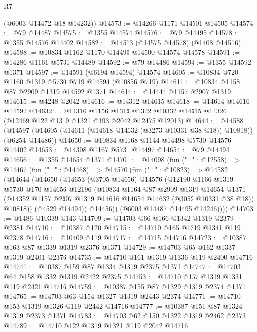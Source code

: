 \begin{lexlean}{R7}
\begin{coremodule}
      (@6003 @14472 @18 @14232))
@14573 := @14266 @1171 @14501 @14505
@14574 := @79 @14487
@14575 := @1355 @14574
@14576 := @79 @14495
@14578 := @1355 @14576 @14402
@14582 := @14573 (@14575 @14578) (@1408 @14516)
@14588 := @10834 @1162 @1170 @14490 @14500 @14574 @14578
@14591 := @14286 @1161 @5731 @14489
@14592 := @79 @14486
@14594 := @1355 @14592 @1371
@14597 := @14591 (@6194 @14594) @14574
@14605 := @10834 @720 @1160 @1319 @5730 @719 @14594 (@10856 @719)
@14611 := @10834 @1158 @87 @2909 @1319 @14592 @1371
@14614 := @14444 @1157 @2907 @1319
@14615 := @4248 @2042
@14616 := @14312 @14615
@14618 := @14614 @14616 @14592
@14632 := @14316
    @1156
    @1319
    @1322
    @10332
    @14615
    @14326
    (@12469 @122 @1319 @1321 @193 @2042 @12475 @12013)
@14644 := @14588
    (@14597 (@14605 (@14611 (@14618 @14632 (@3273 @10331 @38 @18)) @10818)) (@6254 @14486))
@14650 := @10834 @1168 @1144 @14498 @5730 @14576 @14402
@14653 := @14308 @1167 @5731 @14497
@14654 := @79 @14494
@14656 := @1355 @14654 @1371
@14701 := @14098
    (fun ("_" : @12558) =>
    @14467
      (fun ("_" : @14468) =>
      @14570
        (fun ("_" : @10823) =>
        @14582
          (@14644
            (@14650
              (@14653
                (@3705 @14656)
                @14576
                (@12190
                  @1166
                  @1319
                  @5730
                  @170
                  @14656
                  @12196
                  (@10834
                    @1164
                    @87
                    @2909
                    @1319
                    @14654
                    @1371
                    (@14352 @1157 @2907 @1319 @14616 @14654 @14632 (@3052 @10331 @38 @18))
                    @10818))
                (@4529 @14494))
              @14456))
          (@6003 @14487 @14495 @14246))))
@14703 := @1486 @10339 @143
@14709 := @14703 @66 @166 @1342 @1319 @2379 @2381
@14710 := @10387 @120
@14715 := @14710 @165 @1319 @1341 @119 @2378
@14716 := @10409 @119
@14717 := @14715 @14716
@14723 := @10387 @163 @87 @1339 @1319 @2376 @1371
@14729 := @14703 @65 @162 @1337 @1319 @2401 @2376
@14735 := @14710 @161 @1319 @1336 @119 @2400 @14716
@14741 := @10387 @159 @87 @1334 @1319 @2375 @1371
@14747 := @14703 @64 @158 @1332 @1319 @2422 @2375
@14753 := @14710 @157 @1319 @1331 @119 @2421 @14716
@14759 := @10387 @155 @87 @1329 @1319 @2374 @1371
@14765 := @14703 @63 @154 @1327 @1319 @2443 @2374
@14771 := @14710 @153 @1319 @1326 @119 @2442 @14716
@14777 := @10387 @151 @87 @1324 @1319 @2373 @1371
@14783 := @14703 @62 @150 @1322 @1319 @2462 @2373
@14789 := @14710 @122 @1319 @1321 @119 @2042 @14716

\end{coremodule}
\end{lexlean}
